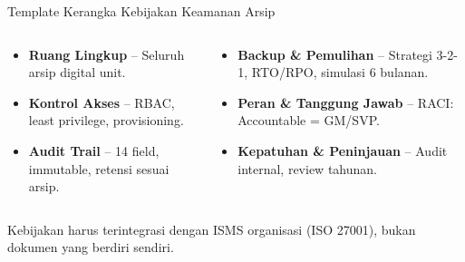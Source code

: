 \documentclass[aspectratio=169,11pt]{beamer}
\begin{document}
\begin{frame}{Template Kerangka Kebijakan Keamanan Arsip}
    \vspace{0.1cm}
    \begin{columns}[T]
        \scriptsize
        \begin{premiumbox}[Klausul 1--3]
            \begin{itemize}
                \item \textbf{Ruang Lingkup} -- Seluruh arsip digital unit.
                \item \textbf{Kontrol Akses} -- RBAC, least privilege, provisioning.
                \item \textbf{Audit Trail} -- 14 field, immutable, retensi sesuai arsip.
            \end{itemize}
        \end{premiumbox}
        
        \scriptsize
        \begin{orangebox}[Klausul 4--6]
            \begin{itemize}
                \item \textbf{Backup \& Pemulihan} -- Strategi 3-2-1, RTO/RPO, simulasi 6 bulanan.
                \item \textbf{Peran \& Tanggung Jawab} -- RACI: Accountable = GM/SVP.
                \item \textbf{Kepatuhan \& Peninjauan} -- Audit internal, review tahunan.
            \end{itemize}
        \end{orangebox}
    \end{columns}
    
    \vspace{0.2cm}
    \begin{greenbox}[Insight]
        \scriptsize Kebijakan harus terintegrasi dengan ISMS organisasi (ISO 27001), bukan dokumen yang berdiri sendiri.
    \end{greenbox}
\end{frame}
\end{document}
